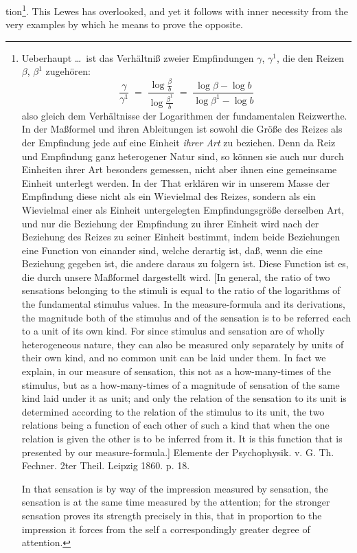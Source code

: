 \documentclass[12pt,a4paper]{book}
\begin{document}
tion\footnote{Ueberhaupt \dots\ ist das Verhältniß zweier Empfindungen $\gamma$,
$\gamma^{1}$, die den Reizen $\beta$, $\beta^{1}$ zugehören:
\[ \frac{\gamma}{\gamma^{1}} \;=\; \frac{\log \frac{\beta}{b}}{\log \frac{\beta^{1}}{b}}
   \;=\; \frac{\log\beta - \log b}{\log\beta^{1} - \log b} \]
also gleich dem Verhältnisse der Logarithmen der fundamentalen Reizwerthe. In der
Maßformel und ihren Ableitungen ist sowohl die Größe des Reizes als der Empfindung
jede auf eine Einheit \emph{ihrer Art} zu beziehen. Denn da Reiz und Empfindung ganz
heterogener Natur sind, so können sie auch nur durch Einheiten ihrer Art besonders
gemessen, nicht aber ihnen eine gemeinsame Einheit unterlegt werden. In der That
erklären wir in unserem Masse der Empfindung diese nicht als ein Wievielmal des
Reizes, sondern als ein Wievielmal einer als Einheit untergelegten Empfindungsgröße
derselben Art, und nur die Beziehung der Empfindung zu ihrer Einheit wird nach der
Beziehung des Reizes zu seiner Einheit bestimmt, indem beide Beziehungen eine Function
von einander sind, welche derartig ist, daß, wenn die eine Beziehung gegeben ist, die
andere daraus zu folgern ist. Diese Function ist es, die durch unsere Maßformel
dargestellt wird. [In general, the ratio of two sensations belonging to the stimuli is
equal to the ratio of the logarithms of the fundamental stimulus values. In the
measure-formula and its derivations, the magnitude both of the stimulus and of the
sensation is to be referred each to a unit of its own kind. For since stimulus and
sensation are of wholly heterogeneous nature, they can also be measured only
separately by units of their own kind, and no common unit can be laid under them. In
fact we explain, in our measure of sensation, this not as a how-many-times of the
stimulus, but as a how-many-times of a magnitude of sensation of the same kind laid
under it as unit; and only the relation of the sensation to its unit is determined
according to the relation of the stimulus to its unit, the two relations being a
function of each other of such a kind that when the one relation is given the other is
to be inferred from it. It is this function that is presented by our measure-formula.]
Elemente der Psychophysik. v. G. Th. Fechner. 2ter Theil. Leipzig 1860. p. 18.
\par In that sensation is by way of the impression measured by sensation, the
sensation is at the same time measured by the attention; for the stronger sensation
proves its strength precisely in this, that in proportion to the impression it forces
from the self a correspondingly greater degree of attention.}. This Lewes has
overlooked, and yet it follows with inner necessity from the very examples by which he
means to prove the opposite.
\end{document}
